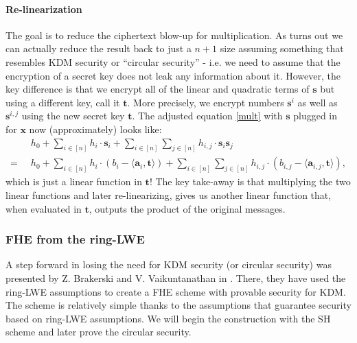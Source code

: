 \paragraph{Re-linearization}
The goal is to reduce the ciphertext blow-up for multiplication. As turns out we can actually reduce the result back to just a $n+1$ size assuming something that resembles KDM security or ``circular security'' - i.e. we need to assume that the encryption of a secret key does not leak any information about it. However, the key difference is that we encrypt all of the linear and quadratic terms of $\bm{s}$ but using a different key, call it $\bm{t}$. More precisely, we encrypt numbers $\bm{s}^i$ as well as $\bm{s}^{i,j}$ using the new secret key $\bm{t}$. The adjusted equation \ref{mult} with $\bm{s}$ plugged in for $\bm{x}$ now (approximately) looks like: 
\begin{align*}
  & h_0 + \sum_{i \in [n]} h_i \cdot \bm{s}_i + \sum_{i \in [n]} \sum_{j \in [n]} h_{i,j} \cdot \bm{s}_i \bm{s}_j\\
  = \; \; & h_0 + \sum_{i \in [n]} h_i \cdot (b_i - \langle \bm{a}_i, \bm{t} \rangle) + \sum_{i \in [n]} \sum_{j \in [n]}  h_{i,j} \cdot (b_{i,j} - \langle \bm{a}_{i,j}, \bm{t} \rangle), 
\end{align*}
which is just a linear function in $\bm{t}$! The key take-away is that multiplying the two linear functions and later re-linearizing, gives us another linear function that, when evaluated in $\bm{t}$, outputs the product of the original messages.

\subsubsection{FHE from the ring-LWE}
A step forward in losing the need for KDM security (or circular security) was presented by Z. Brakerski and V. Vaikuntanathan in \cite{fhe_rlwe}. There, they have used the ring-LWE assumptions to create a FHE scheme with provable security for KDM. The scheme is relatively simple thanks to the assumptions that guarantee security based on ring-LWE assumptions. We will begin the construction with the SH scheme and later prove the circular security.

